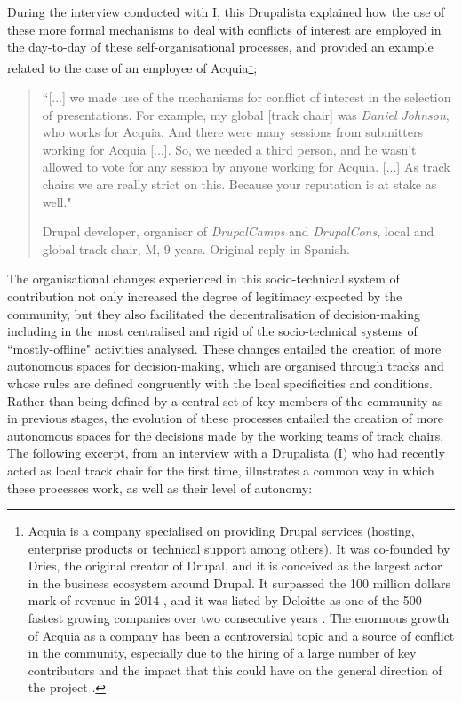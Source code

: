 During the interview conducted with I, this Drupalista explained how the use of these more formal mechanisms to deal with conflicts of interest are employed in the day-to-day of these self-organisational processes, and provided an example related to the case of an employee of Acquia\footnote{Acquia is a company specialised on providing Drupal services (hosting, enterprise products or technical support among others). It was co-founded by Dries, the original creator of Drupal, and it is conceived as the largest actor in the business ecosystem around Drupal. It surpassed the 100 million dollars mark of revenue in 2014 \parencite{acquia-revenue:2016:Online}, and it was listed by Deloitte as one of the 500 fastest growing companies over two consecutive years \parencite{acquia-500:2016:Online}. The enormous growth of Acquia as a company has been a controversial topic and a source of conflict in the community, especially due to the hiring of a large number of key contributors and the impact that this could have on the general direction of the project \parencite[e.g.][]{acquia-influence01:2016:Online, acquia-influence02:2016:Online}.};

\begin{quotation}
``[...] we made use of the mechanisms for conflict of interest in the selection of presentations. For example, my global [track chair] was \textit{Daniel Johnson}, who works for Acquia. And there were many sessions from submitters working for Acquia [...]. So, we needed a third person, and he wasn't allowed to vote for any session by anyone working for Acquia. [...] As track chairs we are really strict on this. Because your reputation is at stake as well."

\begin{flushright}\footnotesize{Drupal developer, organiser of \textit{DrupalCamps} and \textit{DrupalCons}, local and global track chair, M, 9 years. Original reply in Spanish.}\end{flushright}
\end{quotation}

The organisational changes experienced in this socio-technical system of contribution not only increased the degree of legitimacy expected by the community, but they also facilitated the decentralisation of decision-making including in the most centralised and rigid of the socio-technical systems of ``mostly-offline" activities analysed. These changes entailed the creation of more autonomous spaces for decision-making, which are organised through tracks and whose rules are defined congruently with the local specificities and conditions. Rather than being defined by a central set of key members of the community as in previous stages, the evolution of these processes entailed the creation of more autonomous spaces for the decisions made by the working teams of track chairs. The following excerpt, from an interview with a Drupalista (I) who had recently acted as local track chair for the first time, illustrates a common way in which these processes work, as well as their level of autonomy:

